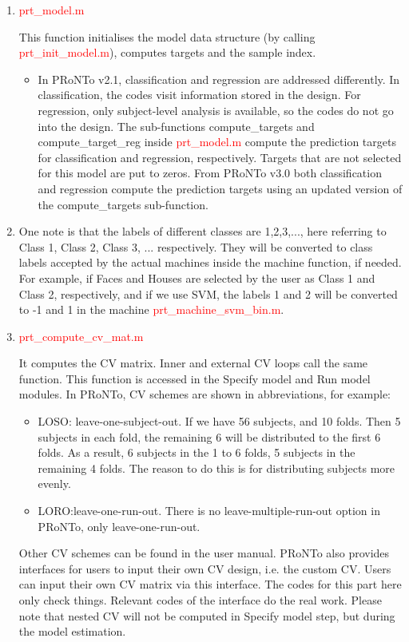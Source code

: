 \begin{enumerate}

\item \textcolor{red}{prt\_model.m}

This function initialises the model data structure (by calling \textcolor{red}{prt\_init\_model.m}), computes targets and the sample index.

\begin{itemize}
\item In PRoNTo v2.1, classification and regression are addressed differently. In classification, the codes visit information stored in the design. For regression, only subject-level analysis is available, so the codes do not go into the design.
The sub-functions compute\_targets and compute\_target\_reg inside \textcolor{red}{prt\_model.m} compute the prediction targets for classification and regression, respectively. Targets that are not selected for this model are put to zeros. From PRoNTo v3.0 both classification and regression compute the prediction targets using an updated version of the compute\_targets sub-function.
\end{itemize}
 
\item One note is that the labels of different classes are 1,2,3,..., here referring to Class 1, Class 2, Class 3, ... respectively. They will be converted to class labels accepted by the actual machines inside the machine function, if needed. For example, if Faces and Houses are selected by the user as Class 1 and Class 2, respectively, and if we use SVM, the labels 1 and 2 will be converted to -1 and 1 in the machine \textcolor{red}{prt\_machine\_svm\_bin.m}.

\item \textcolor{red}{prt\_compute\_cv\_mat.m}

It computes the CV matrix. Inner and external CV loops call the same function. This function is accessed in the Specify model and Run model modules. In PRoNTo, CV schemes are shown in abbreviations, for example:

\begin{itemize}
\item LOSO: leave-one-subject-out. If we have 56 subjects, and 10 folds. Then 5 subjects in each fold, the remaining 6 will be distributed to the first 6 folds. As a result, 6 subjects in the 1 to 6 folds, 5 subjects in the remaining 4 folds. The reason to do this is for distributing subjects more evenly.
\item LORO:leave-one-run-out. There is no leave-multiple-run-out option in PRoNTo, only leave-one-run-out.
\end{itemize}

Other CV schemes can be found in the user manual. PRoNTo also provides interfaces for users to input their own CV design, i.e. the custom CV. Users can input their own CV matrix via this interface. The codes for this part here only check things. Relevant codes of the interface do the real work. Please note that nested CV  will not be computed in Specify model step, but during the model estimation.
 
\end{enumerate}


